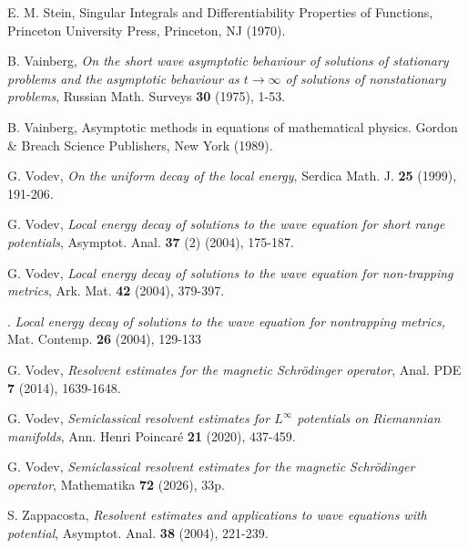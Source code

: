 \documentclass[11pt]{amsart}
\numberwithin{equation}{section}
\begin{document}
\begin{thebibliography}
 {\sc E. M. Stein,} Singular Integrals and Differentiability Properties of Functions, Princeton University Press, Princeton, NJ (1970).

 {\sc B. Vainberg}, {\em On the short wave asymptotic behaviour of solutions of stationary problems and the 
asymptotic behaviour as $t\to\infty$ of solutions of nonstationary problems}, Russian Math. Surveys {\bf 30} (1975), 1-53.

 {\sc B. Vainberg}, Asymptotic methods in equations of mathematical physics. Gordon \& Breach Science Publishers, New York (1989).


 {\sc G. Vodev}, {\em On the uniform decay of the local energy}, Serdica Math. J. {\bf 25} (1999), 191-206.

 {\sc G. Vodev}, {\em Local energy decay of solutions to the wave equation for short range potentials}, Asymptot. Anal. {\bf 37} (2) (2004), 175-187.


 {\sc G. Vodev}, {\em Local energy decay of solutions to the wave equation for non-trapping metrics}, Ark. Mat.
{\bf 42} (2004), 379-397.

. {\em Local energy decay of solutions to the wave equation for nontrapping metrics,} Mat. Contemp. {\bf 26} (2004), 129-133


 {\sc G. Vodev}, {\em Resolvent estimates for the magnetic Schr\"odinger operator}, 
Anal. PDE {\bf 7} (2014), 1639-1648.

 {\sc G. Vodev}, {\em Semiclassical resolvent estimates for $L^\infty$ potentials
on Riemannian manifolds}, Ann. Henri Poincar\'e {\bf 21} (2020), 437-459.

 {\sc G. Vodev}, {\em Semiclassical resolvent estimates for the magnetic Schr\"odinger operator}, Mathematika {\bf 72} (2026),
33p.

 {\sc S. Zappacosta}, {\em Resolvent estimates and applications to wave equations with potential}, Asymptot. Anal. {\bf 38} (2004), 221-239.




\end{thebibliography}
\end{document}
